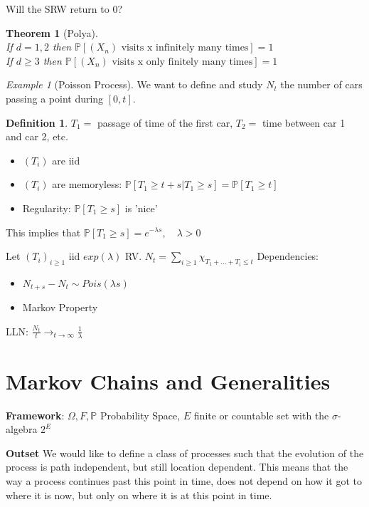 \documentclass[12pt]{book}
\newtheorem{theorem}{Theorem}[section]
\theoremstyle{definition}
\newtheorem{defn}{Definition}[section]
\theoremstyle{remark}
\newtheorem{ex}{Example}[section]
\begin{document}
Will the SRW return to 0?
\begin{theorem}[Polya]\ \\ \indent
	If $d=1,2$ then $\mathbb{P} \left[ (X_n) \text{ visits x infinitely many times} \right] =1$ \\ \indent
	If $d\geq3$ then $\mathbb{P} \left[ (X_n) \text{ visits x only finitely many times} \right] =1$
\end{theorem}

\begin{ex}[Poisson Process]
	We want to define and study $N_t$ the number of cars passing a point during $[0,t]$.
\end{ex}

\begin{defn}
	$T_1 =$ passage of time of the first car, $T_2=$ time between car 1 and car 2, etc. 
\begin{itemize}
	\item $(T_i)$ are iid
	\item $(T_i)$ are memoryless:  $\mathbb{P} \left[ T_1 \geq t+s | T_1 \geq s \right] = \mathbb{P} \left[ T_1 \geq t \right] $ 
	\item Regularity: $\mathbb{P} \left[ T_1 \geq s \right] $ is 'nice'
\end{itemize}
This implies that $\mathbb{P} \left[ T_1 \geq s \right] = e^{- \lambda s}, \quad \lambda>0$
\end{defn}

Let $(T_i)_{i\geq1}$ iid $exp(\lambda)$ RV. $N_t = \sum_{i\geq1}\chi_{T_1 + ... + T_i \leq t}$ \newline
Dependencies:
\begin{itemize}
	\item $N_{t+s}-N_t \sim Pois(\lambda s)$
	\item Markov Property
\end{itemize}
LLN: $ \frac{N_t}{t} \to_{t \to \infty} \frac{1}{\lambda}$



\newpage
\section{Markov Chains and Generalities}
\textbf{Framework}: $\Omega, F, \mathbb{P}$ Probability Space, $E$ finite or countable set with the $\sigma$-algebra $2^E$

\noindent
\textbf{Outset} We would like to define a class of processes such that the evolution of the process is path independent, but still location dependent. This means that the way a process continues past this point in time, does not depend on how it got to where it is now, but only on where it is at this point in time. 
\end{document}
